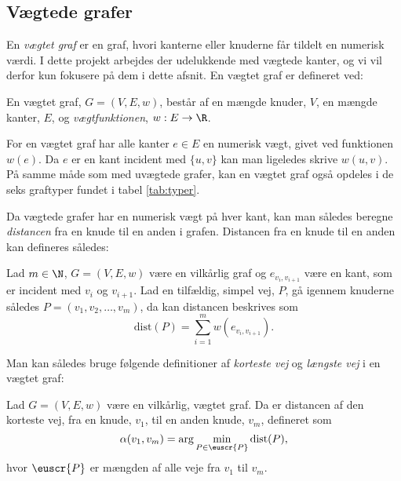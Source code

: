 \subsection{Vægtede grafer}
En \emph{vægtet graf} er en graf, hvori kanterne eller knuderne får tildelt en numerisk værdi. I dette projekt arbejdes der udelukkende med vægtede kanter, og vi vil derfor kun fokusere på dem i dette afsnit.
En vægtet graf er defineret ved:
\begin{defn}
En vægtet graf, $G=(V,E,w)$, består af en mængde knuder, $V$, en mængde kanter, $E$, og \emph{vægtfunktionen}, $w: E \rightarrow \R$.
\end{defn}

For en vægtet graf har alle kanter $e\in E$ en numerisk vægt, givet ved funktionen $w (e)$. Da $e$ er en kant incident med $\{u,v\}$ kan man ligeledes skrive $w (u,v)$. På samme måde som med uvægtede grafer, kan en vægtet graf også opdeles i de seks graftyper fundet i tabel \ref{tab:typer}.


Da vægtede grafer har en numerisk vægt på hver kant, kan man således beregne \emph{distancen} fra en knude til en anden i grafen. Distancen fra en knude til en anden kan defineres således:

\begin{defn}[Distance]
Lad $m\in \N $, $G=(V,E,w)$ være en vilkårlig graf og  $e_{v_i,v_{i+1}}$ være en kant, som er incident med $v_i$ og $v_{i+1}$. Lad en tilfældig, simpel vej, $P$, gå igennem knuderne således $P=(v_{1},v_{2},\dotsc,v_{m})$, da kan distancen beskrives som
	\begin{equation*}
	\mathrm{dist}(P)=\sum_{i=1}^{m}w(e_{v_i,v_{i+1}}).
	\end{equation*}  
\end{defn}

Man kan således bruge følgende definitioner af \emph{korteste vej} og \emph{længste vej} i en vægtet graf:


\begin{defn} \label{defn:min.vej}
Lad $G=(V,E,w)$ være en vilkårlig, vægtet graf. Da er distancen af den korteste vej, fra en knude, $v_1$, til en anden knude, $v_m$, defineret som
	\begin{equation*}
		\alpha(v_1,v_m)=\arg \min_{P \in \euscr{P}}
		\textrm{dist}(P),
	\end{equation*}
	hvor $\euscr{P}$ er mængden af alle veje fra $v_1$ til $v_m$.
\end{defn}

